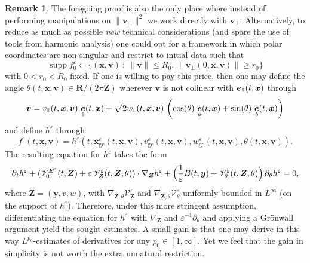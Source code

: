 \documentclass[JEP,XML,SOM,Unicode]{cedram}
\let\mathcal\mathscr
\newcommand{\sperp}{{\scriptscriptstyle\perp}}
\newcommand{\sep}{\ ;\ }
\let\eps\varepsilon
\let\d\partial
\theoremstyle{plain}
\theoremstyle{definition}
\newtheorem{remark}[theorem]{Remark}
\newcommand\br{\begin{remark}}
\newcommand\er{\end{remark}}
\newcommand{\be}{\begin{equation}}
\newcommand{\ee}{\end{equation}}
\newcommand\R{\mathbf R}
\newcommand{\Z}{\mathbf Z}
\newcommand\bE{{\boldsymbol E}}
\newcommand\bZ{{\boldsymbol Z}}
\newcommand\bfv{{\boldsymbol v}}
\newcommand\bfx{{\boldsymbol x}}
\newcommand\bfy{{\boldsymbol y}}
\newcommand\cV{{\mathcal V}}
\DeclareMathOperator{\beD}{\boldsymbol{e}}
\newcommand\eDpar{\beD_\mypar}
\newcommand\eDa{\beD_a}
\newcommand\eDb{\beD_b}
\newcommand\vpar{v_\mypar}
\newcommand\bvperp{\bfv_{\!\sperp}}
\newcommand\wperp{w_{\!\sperp}}
\newcommand{\GC}{\bfx_\mathrm{gc}}
\newcommand{\eGC}{w_\mathrm{gc}}
\newcommand{\vGC}{v_\mathrm{gc}}
\newcommand{\mypar}{{\mkern3mu\vphantom{\perp}\vrule depth 0pt\mkern2mu\vrule depth 0pt\mkern3mu}}
\begin{document}
\br
The foregoing proof is also the only place where instead of performing manipulations on $\|\bvperp\|^2$ we work directly with $\bvperp$. Alternatively, to reduce as much as possible \emph{new} technical considerations (and spare the use of tools from harmonic analysis) one could opt for a framework in which polar coordinates are non-singular and restrict to initial data such that\enlargethispage{\baselineskip}%
\[
\operatorname{supp}f_0^\eps\subset
\{(\bfx,\bfv)\sep \|\bfv\|\leq R_0,\, \|\bvperp(0,\bfx,\bfv)\|\geq r_0\}
\]
with $0<r_0<R_0$ fixed. If one is willing to pay this price, then one may define the angle $\theta(t,\bfx,\bfv)\in \R/(2\pi\Z)$ wherever $\bfv$ is not colinear with $\eDpar(t,\bfx)$ through
\be
\label{def:theta}
\bfv=\vpar(t,\bfx,\bfv)\,\eDpar(t,\bfx)
+\sqrt{2\wperp(t,\bfx,\bfv)}\,\left(
\cos(\theta)\,\eDa(t,\bfx)
+\sin(\theta)\,\eDb(t,\bfx)\right)
\ee
and define $h^\eps$ through\vspace*{-3pt}
\[
f^\eps(t,\bfx,\bfv)=h^\eps(t,\GC^\eps(t,\bfx,\bfv),\vGC^\eps(t,\bfx,\bfv),\eGC^\eps(t,\bfx,\bfv),\theta(t,\bfx,\bfv)).
\]
The resulting equation for $h^\eps$ takes the form\vspace*{-3pt}
\[
\d_th^\eps+(\cV_0^{\bE^\eps}(t,\bZ)
+\eps\,\cV_\bZ^\eps(t,\bZ,\theta))\cdot\nabla_\bZ h^\eps
+\Bigl(\frac1\eps B(t,\bfy)+\cV_\theta^\eps(t,\bZ,\theta)\Bigr)\,\d_\theta h^\eps=0,
\]
where $\bZ=(\bfy,v,w)$, with $\nabla_{\bZ,\theta}\cV_\bZ^\eps$ and $\nabla_{\bZ,\theta}\cV_\theta^\eps$ uniformly bounded in $L^\infty$ (on the support of $h^\eps$). Therefore, under this more stringent assumption, differentiating the equation for $h^\eps$ with $\nabla_\bZ$ and $\eps^{-1}\d_\theta$ and applying a Grönwall argument yield the sought estimates. A small gain is that one may derive in this way $L^{p_0}$-estimates of derivatives for any $p_0\in[1,\infty]$. Yet we feel that the gain in simplicity is not worth the extra unnatural restriction.
\er
\end{document}
